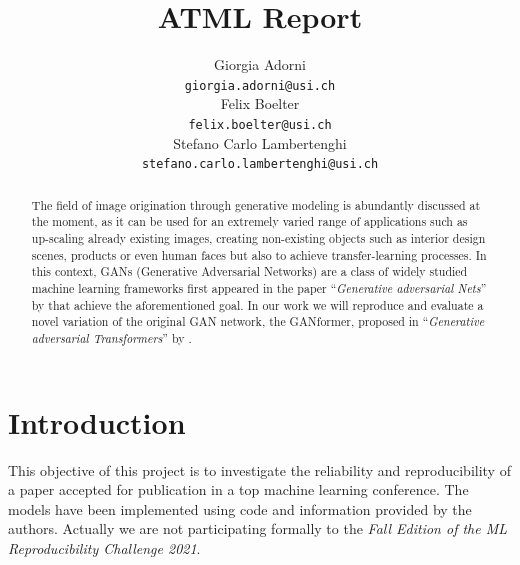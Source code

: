 \documentclass{article}
\title{ATML Report}
\author{%
		Giorgia Adorni \\
		\texttt{giorgia.adorni@usi.ch} \\
		\And
		Felix Boelter\\
		\texttt{felix.boelter@usi.ch}\\
		\And
		Stefano Carlo Lambertenghi\\
		\texttt{stefano.carlo.lambertenghi@usi.ch}\\
}
\begin{document}
	
	\maketitle
	
	\begin{abstract}
		The field of image origination through generative modeling is abundantly discussed at
		the moment, as it can be used for an extremely varied range of applications such as 
		up-scaling already existing images, creating non-existing objects such as interior 
		design scenes, products or even human faces but also to achieve transfer-learning 
		processes.
		In this context, GANs (Generative Adversarial Networks) are a class of widely studied 
		machine learning frameworks first appeared in the paper 
		``\emph{Generative adversarial Nets}'' by \citet{goodfellow2014generative} that achieve
		the aforementioned goal.
		In our work we will reproduce and evaluate a novel variation of the original GAN 
		network, the GANformer, proposed in  ``\emph{Generative adversarial Transformers}'' by 
		\citet{hudson2021generative}.
	\end{abstract}
	
	
	\section{Introduction}
	This objective of this project is to investigate the reliability and reproducibility of a paper accepted 
	for publication in a top machine learning conference.
	The models have been implemented using code and information provided by the authors.	
	Actually we are not participating formally to the \textit{Fall Edition of the ML Reproducibility 
	Challenge 2021}.
	
\end{document}
